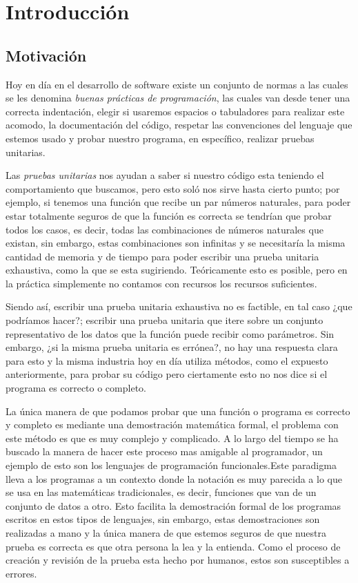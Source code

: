 \chapter{Introducción}

\section{Motivación}
Hoy en día en el desarrollo de software existe un conjunto de normas a las cuales se les denomina
\textit{buenas pr\'acticas de programaci\'on}, las cuales van desde tener una correcta indentaci\'on,
elegir si usaremos espacios o tabuladores para realizar este acomodo, la documentaci\'on del
c\'odigo, respetar las convenciones del lenguaje que estemos usado y probar nuestro programa, en
espec\'ifico, realizar pruebas unitarias.

Las \textit{pruebas unitarias} nos ayudan a saber si nuestro código esta teniendo el comportamiento que
buscamos, pero esto sol\'o nos sirve hasta cierto punto; por ejemplo, si tenemos una funci\'on que
recibe un par números naturales, para poder estar totalmente seguros de que la funci\'on es correcta
se tendrían que probar todos los casos, es decir, todas las combinaciones de números naturales que existan,
sin embargo, estas combinaciones son infinitas y se necesitaría la misma cantidad de memoria y de
tiempo para poder escribir una prueba unitaria exhaustiva, como la que se esta sugiriendo.
Teóricamente esto es posible, pero en la pr\'actica simplemente no contamos con recursos los recursos suficientes.

Siendo as\'i, escribir una prueba unitaria exhaustiva no es factible, en tal caso ¿que podríamos
hacer?; escribir una prueba unitaria que itere sobre un conjunto representativo de los datos que la
funci\'on puede recibir como par\'ametros. Sin embargo, ¿si la misma prueba unitaria es errónea?, no
hay una respuesta clara para esto y la misma industria hoy en día utiliza métodos, como el expuesto
anteriormente, para probar su c\'odigo pero ciertamente esto no nos dice si el programa es correcto o completo.

La única manera de que podamos probar que una función o programa es correcto y completo es mediante
una demostraci\'on matemática formal, el problema con este método es que es muy complejo y
complicado. A lo largo del tiempo se ha buscado la manera de hacer este proceso mas amigable al
programador, un ejemplo de esto son los lenguajes de programación funcionales.Este paradigma lleva%
a los programas a un contexto donde la notaci\'on es muy parecida a lo que se usa en las
matemáticas tradicionales, es decir, funciones que van de un conjunto de datos a otro. Esto
facilita la demostraci\'on formal de los programas escritos en estos tipos de lenguajes, sin embargo,
estas demostraciones son realizadas a mano y la \'unica manera de que estemos
seguros de que nuestra prueba es correcta es que otra persona la lea y la entienda. Como el proceso
de creaci\'on y revisi\'on de la prueba esta hecho por humanos, estos son susceptibles a errores.

